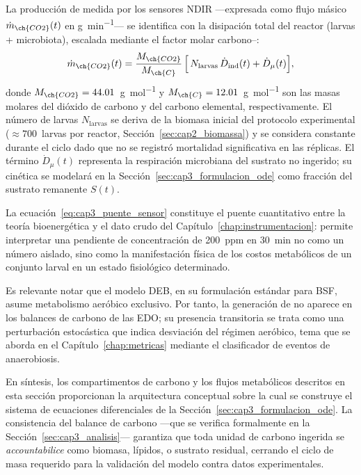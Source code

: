 La producción de  medida por los sensores NDIR ---expresada como flujo másico $\dot{m}_{\ch{CO2}}(t)$ en \si{\gram\per\minute}--- se identifica con la disipación total del reactor (larvas + microbiota), escalada mediante el factor molar carbono--:
\begin{equation}
    \dot{m}_{\ch{CO2}}(t) = \frac{M_{\ch{CO2}}}{M_{\ch{C}}}\,\Bigl[\,N_{\mathrm{larvas}}\,\dot{D}_{\mathrm{ind}}(t) + \dot{D}_{\mu}(t)\Bigr],
    \label{eq:cap3_puente_sensor}
\end{equation}
donde $M_{\ch{CO2}} = 44.01$~\si{\gram\per\mol} y $M_{\ch{C}} = 12.01$~\si{\gram\per\mol} son las masas molares del dióxido de carbono y del carbono elemental, respectivamente. El número de larvas $N_{\mathrm{larvas}}$ se deriva de la biomasa inicial del protocolo experimental ($\approx 700$~larvas por reactor, Sección~\ref{sec:cap2_biomassa}) y se considera constante durante el ciclo dado que no se registró mortalidad significativa en las réplicas. El término $\dot{D}_{\mu}(t)$ representa la respiración microbiana del sustrato no ingerido; su cinética se modelará en la Sección~\ref{sec:cap3_formulacion_ode} como fracción del sustrato remanente $S(t)$.

La ecuación~\eqref{eq:cap3_puente_sensor} constituye el puente cuantitativo entre la teoría bioenergética y el dato crudo del Capítulo~\ref{chap:instrumentacion}: permite interpretar una pendiente de concentración de 200~ppm en 30~min no como un número aislado, sino como la manifestación física de los costos metabólicos de un conjunto larval en un estado fisiológico determinado.

Es relevante notar que el modelo DEB, en su formulación estándar para BSF, asume metabolismo aeróbico exclusivo. Por tanto, la generación de  no aparece en los balances de carbono de las EDO; su presencia transitoria se trata como una perturbación estocástica que indica desviación del régimen aeróbico, tema que se aborda en el Capítulo~\ref{chap:metricas} mediante el clasificador de eventos de anaerobiosis.

En síntesis, los compartimentos de carbono y los flujos metabólicos descritos en esta sección proporcionan la arquitectura conceptual sobre la cual se construye el sistema de ecuaciones diferenciales de la Sección~\ref{sec:cap3_formulacion_ode}. La consistencia del balance de carbono ---que se verifica formalmente en la Sección~\ref{sec:cap3_analisis}--- garantiza que toda unidad de carbono ingerida se \emph{accountabilice} como biomasa, lípidos,  o sustrato residual, cerrando el ciclo de masa requerido para la validación del modelo contra datos experimentales.